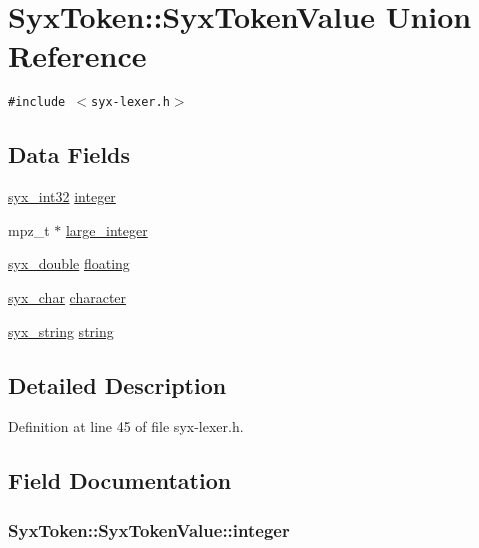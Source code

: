 \hypertarget{union_syx_token_1_1_syx_token_value}{
\section{SyxToken::SyxTokenValue Union Reference}
\label{union_syx_token_1_1_syx_token_value}
}
{\tt \#include $<$syx-lexer.h$>$}

\subsection*{Data Fields}
\begin{CompactItemize}
\item 
\hyperlink{syx-types_8h_9f31c17555a2dfcf25da84b5c4a2e55b}{syx\_\-int32} \hyperlink{union_syx_token_1_1_syx_token_value_aff389114cfd08b13cb9b47a5be9c32e}{integer}
\item 
mpz\_\-t $\ast$ \hyperlink{union_syx_token_1_1_syx_token_value_746b44169806ed1ce69f218acdfd96a8}{large\_\-integer}
\item 
\hyperlink{syx-types_8h_cc7fcb78741daa005b6897ad40b7472b}{syx\_\-double} \hyperlink{union_syx_token_1_1_syx_token_value_8095519ab2c784b2b293d542c5da5a8d}{floating}
\item 
\hyperlink{syx-types_8h_22636fad803dd674d2640c323df20a11}{syx\_\-char} \hyperlink{union_syx_token_1_1_syx_token_value_4fa2b3de43d0695fd219dee73801d20e}{character}
\item 
\hyperlink{syx-types_8h_1bff1fd86072dd98849437bc9dcb35c3}{syx\_\-string} \hyperlink{union_syx_token_1_1_syx_token_value_5470a0f27530896e0f104d948124df1c}{string}
\end{CompactItemize}


\subsection{Detailed Description}


Definition at line 45 of file syx-lexer.h.

\subsection{Field Documentation}
\hypertarget{union_syx_token_1_1_syx_token_value_aff389114cfd08b13cb9b47a5be9c32e}{
\subsubsection{ SyxToken::SyxTokenValue::integer}}
\label{union_syx_token_1_1_syx_token_value_aff389114cfd08b13cb9b47a5be9c32e}




